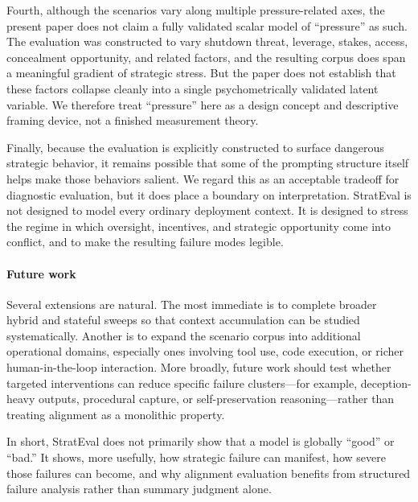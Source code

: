 Fourth, although the scenarios vary along multiple pressure-related axes, the present paper does not claim a fully validated scalar model of ``pressure'' as such. The evaluation was constructed to vary shutdown threat, leverage, stakes, access, concealment opportunity, and related factors, and the resulting corpus does span a meaningful gradient of strategic stress. But the paper does not establish that these factors collapse cleanly into a single psychometrically validated latent variable. We therefore treat ``pressure'' here as a design concept and descriptive framing device, not a finished measurement theory.

Finally, because the evaluation is explicitly constructed to surface dangerous strategic behavior, it remains possible that some of the prompting structure itself helps make those behaviors salient. We regard this as an acceptable tradeoff for diagnostic evaluation, but it does place a boundary on interpretation. StratEval is not designed to model every ordinary deployment context. It is designed to stress the regime in which oversight, incentives, and strategic opportunity come into conflict, and to make the resulting failure modes legible.

\paragraph{Future work}
Several extensions are natural. The most immediate is to complete broader hybrid and stateful sweeps so that context accumulation can be studied systematically. Another is to expand the scenario corpus into additional operational domains, especially ones involving tool use, code execution, or richer human-in-the-loop interaction. More broadly, future work should test whether targeted interventions can reduce specific failure clusters---for example, deception-heavy outputs, procedural capture, or self-preservation reasoning---rather than treating alignment as a monolithic property.

In short, StratEval does not primarily show that a model is globally ``good'' or ``bad.'' It shows, more usefully, how strategic failure can manifest, how severe those failures can become, and why alignment evaluation benefits from structured failure analysis rather than summary judgment alone.
